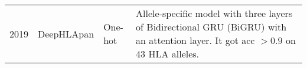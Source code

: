 \begin{table}[h]
{\begin{tabular}{p{1.3cm}p{2.2cm}p{2cm}p{9.5cm}}
			
			2019\cite{wu2019deephlapan}                      & DeepHLApan                              & One-hot             & Allele-specific model with three layers of Bidirectional GRU (BiGRU) with an attention layer. It got acc $> 0.9$ on 43 HLA alleles.                                               
		\end{tabular}
}
\end{table}



